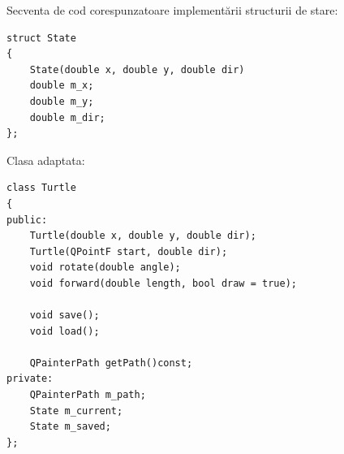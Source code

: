 Secventa de cod corespunzatoare implementării structurii de stare:

\lstset{language=C++}
\begin{lstlisting}
struct State
{
    State(double x, double y, double dir) 
    double m_x;
    double m_y;
    double m_dir;
};
\end{lstlisting}

Clasa adaptata:

\lstset{language=C++}
\begin{lstlisting}
class Turtle
{
public:
    Turtle(double x, double y, double dir);
    Turtle(QPointF start, double dir);
    void rotate(double angle);
    void forward(double length, bool draw = true);

    void save();
    void load();

    QPainterPath getPath()const;
private:
    QPainterPath m_path;
    State m_current;
    State m_saved;
};
\end{lstlisting}


